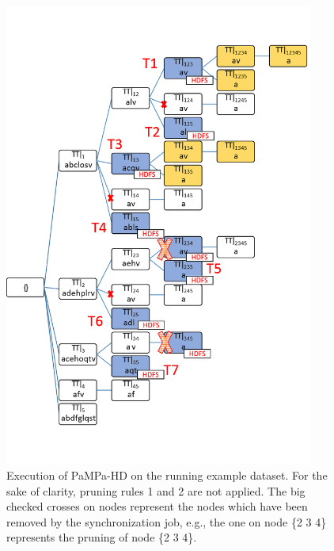 \begin{figure}[!t]
\includegraphics[width=4in]{chapters/pampa/running_example3_d_B_quadretti.png}
\caption{Execution of PaMPa-HD on the running example dataset.
For the sake of clarity, pruning rules 1 and 2 are not
applied. The big checked crosses on nodes represent the nodes which have been
removed by the synchronization job, e.g.,
the one on node \{2 3 4\} represents the pruning of node \{2 3 4\}.}
\label{running_3b}
\end{figure}


